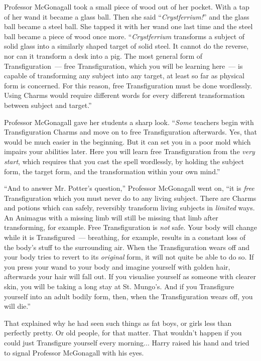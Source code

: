 Professor McGonagall took a small piece of wood out of her pocket. With a tap of her wand it became a glass ball. Then she said ``\emph{Crystferrium!}'' and the glass ball became a steel ball. She tapped it with her wand one last time and the steel ball became a piece of wood once more. ``\emph{Crystferrium} transforms a subject of solid glass into a similarly shaped target of solid steel. It cannot do the reverse, nor can it transform a desk into a pig. The most general form of Transfiguration~--- free Transfiguration, which you will be learning here~--- is capable of transforming any subject into any target, at least so far as physical form is concerned. For this reason, free Transfiguration must be done wordlessly. Using Charms would require different words for every different transformation between subject and target.''

Professor McGonagall gave her students a sharp look. ``\emph{Some} teachers begin with Transfiguration Charms and move on to free Transfiguration afterwards. Yes, that would be much easier in the beginning. But it can set you in a poor mold which impairs your abilities later. Here you will learn free Transfiguration from the \emph{very start}, which requires that you cast the spell wordlessly, by holding the subject form, the target form, and the transformation within your own mind.''

``And to answer Mr. Potter's question,'' Professor McGonagall went on, ``it is \emph{free} Transfiguration which you must never do to any living subject. There are Charms and potions which can safely, reversibly transform living subjects in \emph{limited} ways. An Animagus with a missing limb will still be missing that limb after transforming, for example. Free Transfiguration is \emph{not} safe. Your body will change while it is Transfigured~--- breathing, for example, results in a constant loss of the body's stuff to the surrounding air. When the Transfiguration wears off and your body tries to revert to its \emph{original} form, it will not quite be able to do so. If you press your wand to your body and imagine yourself with golden hair, afterwards your hair will fall out. If you visualise yourself as someone with clearer skin, you will be taking a long stay at St. Mungo's. And if you Transfigure yourself into an adult bodily form, then, when the Transfiguration wears off, you will die.''

That explained why he had seen such things as fat boys, or girls less than perfectly pretty. Or old people, for that matter. That wouldn't happen if you could just Transfigure yourself every morning... Harry raised his hand and tried to signal Professor McGonagall with his eyes.

